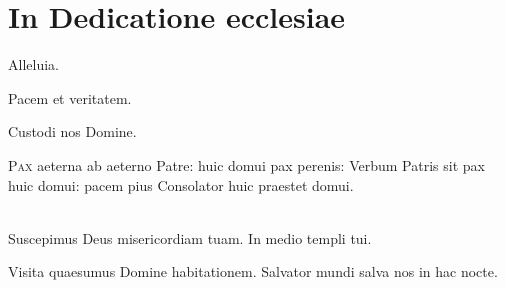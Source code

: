 \chapter{In Dedicatione ecclesiae}
\label{form:dedicatio}

Alleluia.

Pacem et veritatem.


 Custodi nos Domine.

\lettrine{P}{ax} aeterna ab aeterno Patre:
huic domui pax perenis:
Verbum Patris sit pax huic domui:
pacem pius Consolator huic praestet domui.

\\
Suscepimus Deus misericordiam tuam.
In medio templi tui.

Visita quaesumus Domine habitationem.
Salvator mundi salva nos in hac nocte.

\headingCantus


